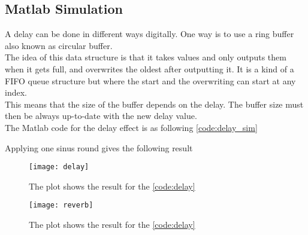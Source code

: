 \subsection{Matlab Simulation}

A delay can be done in different ways digitally. One way is to use a ring buffer also known as circular buffer. \\
The idea of this data structure is that it takes values and only outputs them when it gets full, and overwrites the oldest after outputting it. It is a kind of a FIFO queue structure but where the start and the overwriting can start at any index. \\
This means that the size of the buffer depends on the delay.  The buffer size must then be always up-to-date with the new delay value. \\ 

The Matlab code for the delay effect is as following \autoref{code:delay_sim}

Applying one sinus round gives the following result

\begin{figure}[htbp]
	\centering
	\texttt{[image: delay]}
	\caption{The plot shows the result for the \autoref{code:delay}}
	\label{fig:delay_plot}
\end{figure}



\begin{figure}[htbp]
	\centering
	\texttt{[image: reverb]}
	\caption{The plot shows the result for the \autoref{code:delay}}
	\label{fig:reverb_plot}
\end{figure}